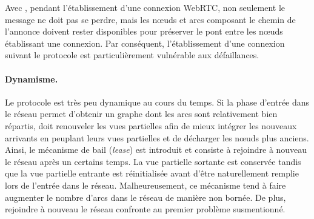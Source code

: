 \noindent Avec \SCAMP, pendant l'établissement d'une connexion WebRTC, non
seulement le message ne doit pas se perdre, mais les nœuds et arcs composant le
chemin de l'annonce doivent rester disponibles pour préserver le pont entre les
nœuds établissant une connexion. Par conséquent, l'établissement d'une connexion
suivant le protocole \SCAMP est particulièrement vulnérable aux défaillances.




\paragraph{Dynamisme.} Le protocole est très peu dynamique au cours du temps. Si
la phase d'entrée dans le réseau permet d'obtenir un graphe dont les arcs sont
relativement bien répartis, \SCAMP doit renouveler les vues partielles afin de
mieux intégrer les nouveaux arrivants en peuplant leurs vues partielles et de
décharger les nœuds plus anciens. Ainsi, le mécanisme de bail (\emph{lease})
est introduit et consiste à rejoindre à nouveau le réseau après un certains
temps. La vue partielle sortante est conservée tandis que la vue partielle
entrante est réinitialisée avant d'être naturellement remplie lors de l'entrée
dans le réseau. Malheureusement, ce mécanisme tend à faire augmenter le nombre
d'arcs dans le réseau de manière non bornée. De plus, rejoindre à nouveau le
réseau confronte au premier problème susmentionné.



